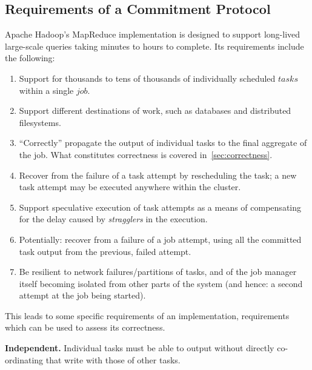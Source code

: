 \documentclass[format=acmsmall, screen=true, nonacm, timestamp, review=false]{acmart}
\begin{document}
\subsection{Requirements of a Commitment Protocol}
\label{subsec:commit-protocol-requirements}

Apache Hadoop's MapReduce implementation is designed to support long-lived
large-scale queries taking minutes to hours to complete.
Its requirements include the following:

\begin{enumerate}

  \item Support for thousands to tens of thousands of individually scheduled $tasks$
  within a single $job$.

  \item Support different destinations of work, such as databases and
  distributed filesystems.

  \item ``Correctly'' propagate the output of individual tasks to the final
  aggregate of the job.
  What constitutes correctness is covered in\ \ref{sec:correctness}.

  \item Recover from the failure of a task attempt by rescheduling the task;
  a new task attempt may be executed anywhere within the cluster.

  \item Support speculative execution of task attempts as a means of compensating for the
  delay caused by \emph{stragglers} in the execution.

  \item Potentially: recover from a failure of a job attempt, using all the committed
  task output from the previous, failed attempt.

  \item Be resilient to network failures/partitions of tasks, and of the job manager
  itself becoming isolated from other parts of the system (and hence: a second
  attempt at the job being started).

\end{enumerate}

This leads to some specific requirements of an implementation, requirements
which can be used to assess its correctness.

\textbf{Independent.}
Individual tasks must be able to output without directly
co-ordinating that write with those of other tasks.
\end{document}
